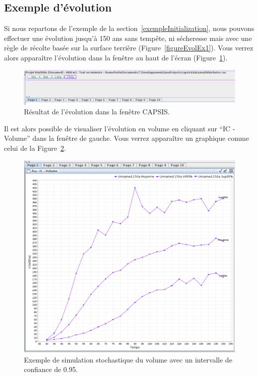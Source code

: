 \documentclass[a4paper,12pt]{article}
\begin{document}
\subsection{Exemple d'évolution}

Si nous repartons de l'exemple de la section~\ref{exempleInitialization}, nous pouvons effectuer une évolution jusqu'à 150 ans sans tempête, ni sécheresse mais avec une règle de récolte basée sur la surface terrière (Figure~\ref{figureEvolEx1}). Vous verrez alors apparaître l'évolution dans la fenêtre au haut de l'écran (Figure~\ref{figureEvolEx2}). 

\begin{figure}[!h]
\begin{center}
\includegraphics[width=\textwidth]{./figures/evolutionExample2}
\caption{Résultat de l'évolution dans la fen\^etre CAPSIS.}
\label{figureEvolEx2}
\end{center}
\end{figure}

Il est alors possible de visualiser l'évolution en volume en cliquant sur ``IC - Volume'' dans la fenêtre de gauche. Vous verrez apparaître un graphique comme celui de la Figure~\ref{figureEvolEx3}.

\begin{figure}[!h]
\begin{center}
\includegraphics[width=\textwidth]{./figures/evolutionExample3}
\caption{Exemple de simulation stochastique du volume avec un intervalle de confiance de 0.95.}
\label{figureEvolEx3}
\end{center}
\end{figure}
\end{document}
